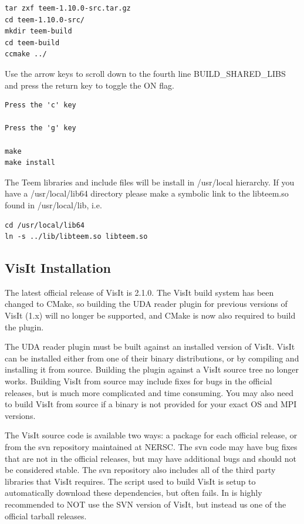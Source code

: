 \documentclass[12pt]{article}
\begin{document}
\begin{verbatim}
tar zxf teem-1.10.0-src.tar.gz
cd teem-1.10.0-src/
mkdir teem-build
cd teem-build
ccmake ../
\end{verbatim}

Use the arrow keys to scroll down to the fourth line
BUILD\_SHARED\_LIBS and press the return key to toggle the ON flag.

\begin{verbatim}
Press the 'c' key

Press the 'g' key

make
make install
\end{verbatim}
The Teem libraries and include files will be install in /usr/local
hierarchy.  If you have a /usr/local/lib64 directory please make a
symbolic link to the libteem.so found in /usr/local/lib, i.e.

\begin{verbatim}
cd /usr/local/lib64
ln -s ../lib/libteem.so libteem.so
\end{verbatim}

\subsection{VisIt Installation}

The latest official release of VisIt is 2.1.0.  The VisIt build system
has been changed to CMake, so building the UDA reader plugin for
previous versions of VisIt (1.x) will no longer be supported, and
CMake is now also required to build the plugin.

The UDA reader plugin must be built against an installed version of
VisIt.  VisIt can be installed either from one of their binary
distributions, or by compiling and installing it from source.
Building the plugin against a VisIt source tree no longer works.
Building VisIt from source may include fixes for bugs in the official
releases, but is much more complicated and time consuming.  You may
also need to build VisIt from source if a binary is not provided for
your exact OS and MPI versions.

The VisIt source code is available two ways: a package for each
official release, or from the svn repository maintained at NERSC.  The
svn code may have bug fixes that are not in the official releases, but
may have additional bugs and should not be considered stable.  The svn
repository also includes all of the third party libraries that VisIt
requires.  The script used to build VisIt is setup to automatically
download these dependencies, but often fails.  In is highly
recommended to NOT use the SVN version of VisIt, but instead us one of
the official tarball releases.
\end{document}

